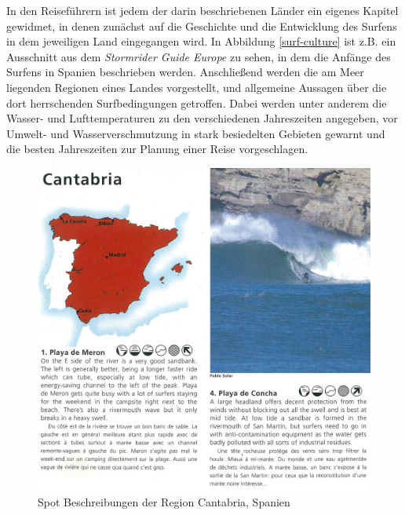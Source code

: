 In den Reiseführern ist jedem der darin beschriebenen Länder ein
eigenes Kapitel gewidmet, in denen zunächst auf die Geschichte und die
Entwicklung des Surfens in dem jeweiligen Land eingegangen wird. In
Abbildung \ref{surf-culture} ist z.B. ein Ausschnitt aus dem
\textit{Stormrider Guide Europe} zu sehen, in dem die Anfänge des
Surfens in Spanien beschrieben werden. Anschließend werden die am Meer
liegenden Regionen eines Landes vorgestellt, und allgemeine Aussagen
über die dort herrschenden Surfbedingungen getroffen. Dabei werden
unter anderem die Wasser- und Lufttemperaturen zu den verschiedenen
Jahreszeiten angegeben, vor Umwelt- und Wasserverschmutzung in stark
besiedelten Gebieten gewarnt und die besten Jahreszeiten zur Planung
einer Reise vorgeschlagen.

\begin{figure}[h]
  \includegraphics[width=\textwidth]{bilder/spot-descriptions}
  \caption{Spot Beschreibungen der Region Cantabria, Spanien}
  \label{spot-descriptions}
\end{figure}

